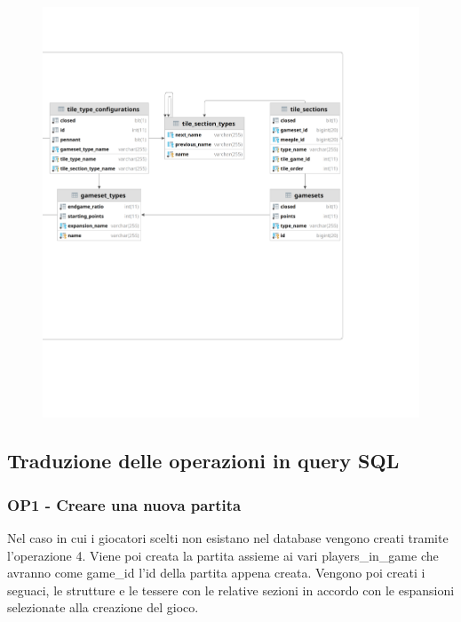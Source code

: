 \begin{figure}[ht]
    \includegraphics[width=1.247\textwidth, right]{images/Progettazione/relazionale_right.png}
\end{figure}

\clearpage
\subsection{Traduzione delle operazioni in query SQL}
\subsubsection*{OP1 - Creare una nuova partita}
Nel caso in cui i giocatori scelti non esistano nel database vengono creati tramite l'operazione 4. Viene poi creata la partita assieme ai vari players\_in\_game che avranno come game\_id l'id della partita appena creata. Vengono poi creati i seguaci, le strutture e le tessere con le relative sezioni in accordo con le espansioni selezionate alla creazione del gioco.
\medskip

